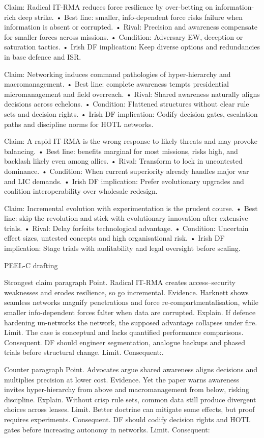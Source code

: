 Claim: Radical IT-RMA reduces force resilience by over-betting on information-rich deep strike.
• Best line: smaller, info-dependent force risks failure when information is absent or corrupted. {\small }
• Rival: Precision and awareness compensate for smaller forces across missions.
• Condition: Adversary EW, deception or saturation tactics.
• Irish DF implication: Keep diverse options and redundancies in base defence and ISR.

Claim: Networking induces command pathologies of hyper-hierarchy and macromanagement.
• Best line: complete awareness tempts presidential micromanagement and field overreach. {\small }
• Rival: Shared awareness naturally aligns decisions across echelons.
• Condition: Flattened structures without clear rule sets and decision rights.
• Irish DF implication: Codify decision gates, escalation paths and discipline norms for HOTL networks.

Claim: A rapid IT-RMA is the wrong response to likely threats and may provoke balancing.
• Best line: benefits marginal for most missions, risks high, and backlash likely even among allies. {\small }
• Rival: Transform to lock in uncontested dominance.
• Condition: When current superiority already handles major war and LIC demands.
• Irish DF implication: Prefer evolutionary upgrades and coalition interoperability over wholesale redesign.

Claim: Incremental evolution with experimentation is the prudent course.
• Best line: skip the revolution and stick with evolutionary innovation after extensive trials. {\small }
• Rival: Delay forfeits technological advantage.
• Condition: Uncertain effect sizes, untested concepts and high organisational risk.
• Irish DF implication: Stage trials with auditability and legal oversight before scaling.

PEEL-C drafting

Strongest claim paragraph
Point. Radical IT-RMA creates access–security weaknesses and erodes resilience, so go incremental.
Evidence. Harknett shows seamless networks magnify penetrations and force re-compartmentalisation, while smaller info-dependent forces falter when data are corrupted. {\small }
Explain. If defence hardening un-networks the network, the supposed advantage collapses under fire.
Limit. The case is conceptual and lacks quantified performance comparisons.
Consequent. DF should engineer segmentation, analogue backups and phased trials before structural change. Limit. Consequent:.

Counter paragraph
Point. Advocates argue shared awareness aligns decisions and multiplies precision at lower cost.
Evidence. Yet the paper warns awareness invites hyper-hierarchy from above and macromanagement from below, risking discipline. {\small }
Explain. Without crisp rule sets, common data still produce divergent choices across lenses.
Limit. Better doctrine can mitigate some effects, but proof requires experiments.
Consequent. DF should codify decision rights and HOTL gates before increasing autonomy in networks. Limit. Consequent:


